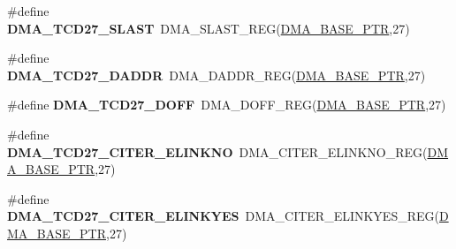 \begin{DoxyCompactItemize}
\item 
\hypertarget{group___d_m_a___register___accessor___macros_ga0cd6223f7b3f9251f7caae73041506f8}{}\#define {\bfseries D\+M\+A\+\_\+\+T\+C\+D27\+\_\+\+S\+L\+A\+S\+T}~D\+M\+A\+\_\+\+S\+L\+A\+S\+T\+\_\+\+R\+E\+G(\hyperlink{group___d_m_a___peripheral_ga6997fbc1b1973e9f27170217a3bd6f22}{D\+M\+A\+\_\+\+B\+A\+S\+E\+\_\+\+P\+T\+R},27)\label{group___d_m_a___register___accessor___macros_ga0cd6223f7b3f9251f7caae73041506f8}

\item 
\hypertarget{group___d_m_a___register___accessor___macros_ga81d8acc9fcb30b3e497f264cee04a26b}{}\#define {\bfseries D\+M\+A\+\_\+\+T\+C\+D27\+\_\+\+D\+A\+D\+D\+R}~D\+M\+A\+\_\+\+D\+A\+D\+D\+R\+\_\+\+R\+E\+G(\hyperlink{group___d_m_a___peripheral_ga6997fbc1b1973e9f27170217a3bd6f22}{D\+M\+A\+\_\+\+B\+A\+S\+E\+\_\+\+P\+T\+R},27)\label{group___d_m_a___register___accessor___macros_ga81d8acc9fcb30b3e497f264cee04a26b}

\item 
\hypertarget{group___d_m_a___register___accessor___macros_gaf45b8f80c7e5dd6d35e2670584adc78c}{}\#define {\bfseries D\+M\+A\+\_\+\+T\+C\+D27\+\_\+\+D\+O\+F\+F}~D\+M\+A\+\_\+\+D\+O\+F\+F\+\_\+\+R\+E\+G(\hyperlink{group___d_m_a___peripheral_ga6997fbc1b1973e9f27170217a3bd6f22}{D\+M\+A\+\_\+\+B\+A\+S\+E\+\_\+\+P\+T\+R},27)\label{group___d_m_a___register___accessor___macros_gaf45b8f80c7e5dd6d35e2670584adc78c}

\item 
\hypertarget{group___d_m_a___register___accessor___macros_ga1f323ef72c9aa736fd724abb65461acf}{}\#define {\bfseries D\+M\+A\+\_\+\+T\+C\+D27\+\_\+\+C\+I\+T\+E\+R\+\_\+\+E\+L\+I\+N\+K\+N\+O}~D\+M\+A\+\_\+\+C\+I\+T\+E\+R\+\_\+\+E\+L\+I\+N\+K\+N\+O\+\_\+\+R\+E\+G(\hyperlink{group___d_m_a___peripheral_ga6997fbc1b1973e9f27170217a3bd6f22}{D\+M\+A\+\_\+\+B\+A\+S\+E\+\_\+\+P\+T\+R},27)\label{group___d_m_a___register___accessor___macros_ga1f323ef72c9aa736fd724abb65461acf}

\item 
\hypertarget{group___d_m_a___register___accessor___macros_gaa2746b97668cdd41d9a858d85b805c30}{}\#define {\bfseries D\+M\+A\+\_\+\+T\+C\+D27\+\_\+\+C\+I\+T\+E\+R\+\_\+\+E\+L\+I\+N\+K\+Y\+E\+S}~D\+M\+A\+\_\+\+C\+I\+T\+E\+R\+\_\+\+E\+L\+I\+N\+K\+Y\+E\+S\+\_\+\+R\+E\+G(\hyperlink{group___d_m_a___peripheral_ga6997fbc1b1973e9f27170217a3bd6f22}{D\+M\+A\+\_\+\+B\+A\+S\+E\+\_\+\+P\+T\+R},27)\label{group___d_m_a___register___accessor___macros_gaa2746b97668cdd41d9a858d85b805c30}


\end{DoxyCompactItemize}

